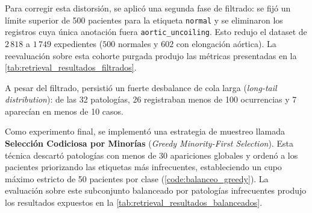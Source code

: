 \documentclass[../tesis.tex]{subfiles}
\begin{document}
Para corregir esta distorsión, se aplicó una segunda fase de filtrado: se fijó un límite superior de 500 pacientes para la etiqueta \texttt{normal} y se eliminaron los registros cuya única anotación fuera \texttt{aortic\_uncoiling}. Esto redujo el dataset de $2\,818$ a $1\,749$ expedientes ($500$ normales y $602$ con elongación aórtica). La reevaluación sobre esta cohorte purgada produjo las métricas presentadas en la \autoref{tab:retrieval_resultados_filtrados}.

\begin{table}[htbp]
\centering
\small
{}
\caption{Desempeño del sistema de recuperación tras la eliminación de etiquetas benignas sobrepresentadas ($1\,749$ pacientes).}
\label{tab:retrieval_resultados_filtrados}
\end{table}

A pesar del filtrado, persistió un fuerte desbalance de cola larga (\textit{long-tail distribution}): de las 32 patologías, 26 registraban menos de 100 ocurrencias y 7 aparecían en menos de 10 casos.

Como experimento final, se implementó una estrategia de muestreo llamada \textbf{Selección Codiciosa por Minorías} (\textit{Greedy Minority-First Selection}). Esta técnica descartó patologías con menos de 30 apariciones globales y ordenó a los pacientes priorizando las etiquetas más infrecuentes, estableciendo un cupo máximo estricto de 50 pacientes por clase (\autoref{code:balanceo_greedy}). La evaluación sobre este subconjunto balanceado por patologías infrecuentes produjo los resultados expuestos en la \autoref{tab:retrieval_resultados_balanceados}.
\end{document}
